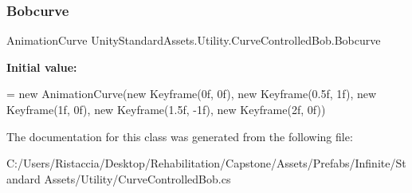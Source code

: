 \subsubsection{\texorpdfstring{Bobcurve}{Bobcurve}}
{\footnotesize\ttfamily Animation\+Curve Unity\+Standard\+Assets.\+Utility.\+Curve\+Controlled\+Bob.\+Bobcurve}

{\bfseries Initial value\+:}
\begin{DoxyCode}
= \textcolor{keyword}{new} AnimationCurve(\textcolor{keyword}{new} Keyframe(0f, 0f), \textcolor{keyword}{new} Keyframe(0.5f, 1f),
                                                            \textcolor{keyword}{new} Keyframe(1f, 0f), \textcolor{keyword}{new} Keyframe(1.5f, -1f),
                                                            \textcolor{keyword}{new} Keyframe(2f, 0f))
\end{DoxyCode}


The documentation for this class was generated from the following file\+:\begin{DoxyCompactItemize}
\item 
C\+:/\+Users/\+Ristaccia/\+Desktop/\+Rehabilitation/\+Capstone/\+Assets/\+Prefabs/\+Infinite/\+Standard Assets/\+Utility/Curve\+Controlled\+Bob.\+cs\end{DoxyCompactItemize}
